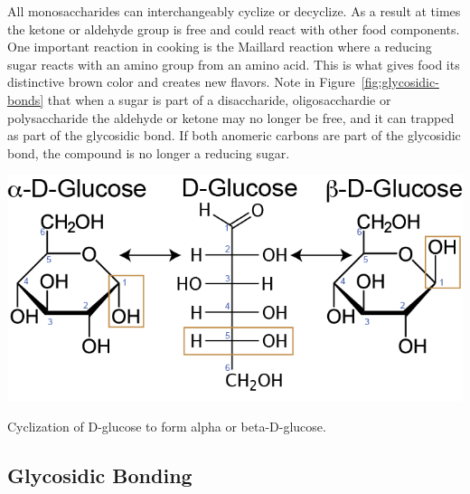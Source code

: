 \documentclass{tufte-handout}
\begin{document}
  All monosaccharides can interchangeably cyclize or decyclize.  As a result at times the ketone or aldehyde group is free and could react with other food components.  One important reaction in cooking is the Maillard reaction where a reducing sugar reacts with an amino group from an amino acid.  This is what gives food its distinctive brown color and creates new flavors.  Note in Figure~\ref{fig:glycosidic-bonds} that when a sugar is part of a disaccharide, oligosacchardie or polysaccharide the aldehyde or ketone may no longer be free, and it can trapped as part of the glycosidic bond.  If both anomeric carbons are part of the glycosidic bond, the compound is no longer a reducing sugar.


\begin{marginfigure}
\includegraphics{figures/Glucose-ab.png}
\caption{Cyclization of D-glucose to form alpha or beta-D-glucose.}\label{fig:sugar-ab}
\end{marginfigure}


\subsection{Glycosidic Bonding}
\end{document}
